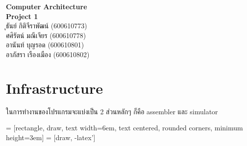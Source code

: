 \documentclass[14pt]{article}
\begin{document}
\begin{titlepage}
    \begin{center}
       \Large\textbf{Computer Architecture}\\
       \textbf{Project 1}\\
       \vspace{2cm}
       ุธันย์ กิติจีราพัฒน์ (600610773) \\ ศศิรัตน์ มณีเจียร (600610778) \\ อานันท์ บุญรอด (600610801) \\ อาภัสรา เรืองเมือง (600610802)

    \end{center}
 \end{titlepage}
\section{Infrastructure}
ในการทำงานของโปรแกรมจะแบ่งเป็น 2 ส่วนหลักๆ ก็คือ assembler และ simulator 
\begin{center}
     = [rectangle, draw, 
        text width=6em, text centered, rounded corners, minimum height=3em]
     = [draw, -latex']
    
    \end{center}
\end{document}
